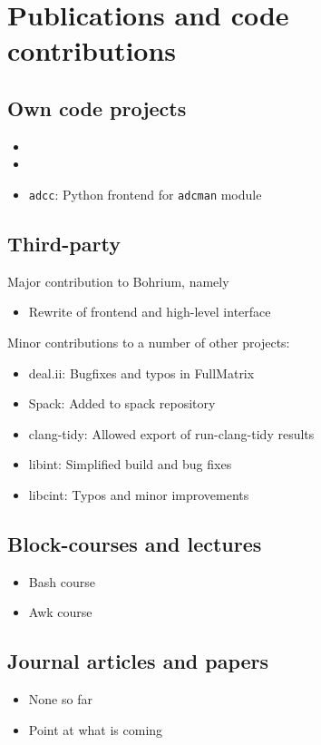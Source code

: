 \chapter*{Publications and code contributions}

\section{Own code projects}
\begin{itemize}
	\item \molsturm
	\item \lazyten
	\item \texttt{adcc}: Python frontend for \texttt{adcman} module
\end{itemize}

\section{Third-party}
Major contribution to Bohrium, namely
\begin{itemize}
	\item Rewrite of \cpp frontend and high-level \cpp interface
\end{itemize}

Minor contributions to a number of other projects:
\begin{itemize}
	\item deal.ii: Bugfixes and typos in FullMatrix
	\item Spack: Added \lazyten to spack repository
	\item clang-tidy: Allowed export of run-clang-tidy results
	\item libint: Simplified build and bug fixes
	\item libcint: Typos and minor improvements
\end{itemize}

\section{Block-courses and lectures}
\begin{itemize}
	\item Bash course
	\item Awk course
\end{itemize}

\section{Journal articles and papers}
\begin{itemize}
	\item None so far
	\item Point at what is coming
\end{itemize}

